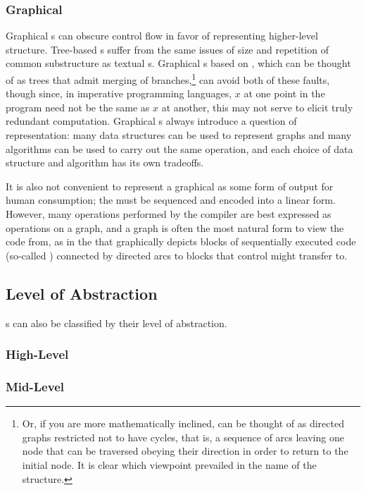 \subsubsection{Graphical}
Graphical s can obscure control flow in favor of representing higher-level structure. Tree-based s suffer from the same issues of size and repetition of common substructure as textual s. Graphical s based on , which can be thought of as trees that admit merging of branches,\footnote{Or, if you are more mathematically inclined, can be thought of as directed graphs restricted not to have cycles, that is, a sequence of arcs leaving one node that can be traversed obeying their direction in order to return to the initial node. It is clear which viewpoint prevailed in the name of the structure.} can avoid both of these faults, though since, in imperative programming languages, $x$ at one point in the program need not be the same as $x$ at another, this may not serve to elicit truly redundant computation. Graphical s always introduce a question of representation: many data structures can be used to represent graphs and many algorithms can be used to carry out the same operation, and each choice of data structure and algorithm has its own tradeoffs.

It is also not convenient to represent a graphical  as some form of output for human consumption; the  must be sequenced and encoded into a linear form. However, many operations performed by the compiler are best expressed as operations on a graph, and a graph is often the most natural form to view the code from, as in the  that graphically depicts blocks of sequentially executed code (so-called ) connected by directed arcs to blocks that control might transfer to.

\subsection{Level of Abstraction}
s can also be classified by their level of abstraction. 
\subsubsection{High-Level}
\subsubsection{Mid-Level}
